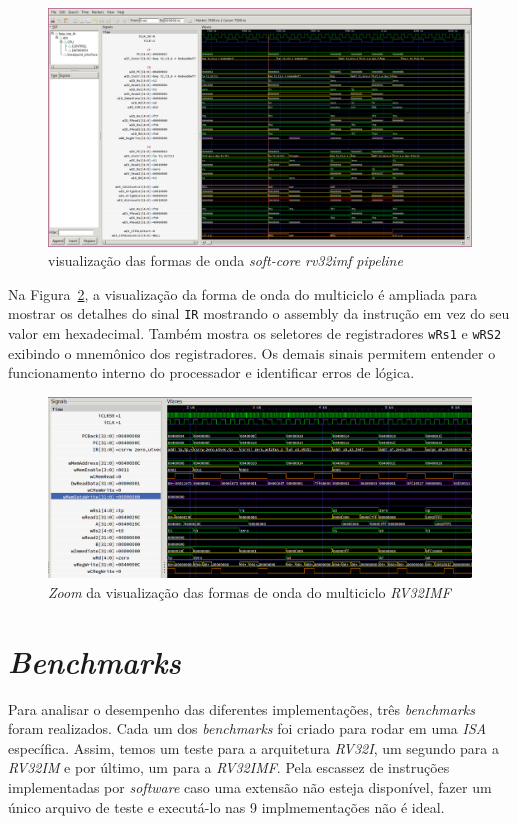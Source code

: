     \begin{figure}[h]
    \centering
        \includegraphics[width=0.9\linewidth]{../images/gtkwave/gtkwave_pipe.png}
        \caption{visualização das formas de onda \textit{soft-core} \textit{rv32imf} \textit{pipeline}}
        \label{fig:gtkwave_pipe}
    \end{figure}

    { Na Figura~\ref{fig:gtkwave_zoom}, a visualização da forma de onda do
        multiciclo é ampliada para mostrar os detalhes do sinal \texttt{IR}
        mostrando o assembly da instrução em vez do seu valor em hexadecimal.
        Também mostra os seletores de registradores \texttt{wRs1} e \texttt{wRS2}
        exibindo o mnemônico dos registradores. Os demais sinais permitem entender
        o funcionamento interno do processador e identificar erros de lógica.
    }

    \begin{figure}[h]
    \centering
        \includegraphics[width=1\linewidth]{../images/gtkwave/gtkwave_zoom.png}
        \caption{\textit{Zoom} da visualização das formas de onda do multiciclo \textit{RV32IMF}}
        \label{fig:gtkwave_zoom}
    \end{figure}

\clearpage
\section{\textit{Benchmarks}}
    { Para analisar o desempenho das diferentes implementações, três \textit{benchmarks}
        foram realizados. Cada um dos \textit{benchmarks} foi criado para rodar
        em uma \textit{ISA} específica. Assim, temos um teste para a arquitetura
        \textit{RV32I}, um segundo para a \textit{RV32IM} e por último, um para a
        \textit{RV32IMF}. Pela escassez de instruções implementadas por \textit{software}
        caso uma extensão não esteja disponível, fazer um único arquivo de teste
        e executá-lo nas 9 implmementações não é ideal.
    }

